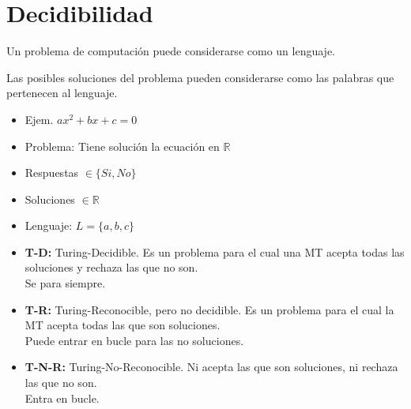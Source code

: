 \section{Decidibilidad}
Un problema de computación puede considerarse como un lenguaje.

Las posibles soluciones del problema pueden considerarse como las palabras que pertenecen al lenguaje.
\begin{itemize}
    \item Ejem. $ax^2+bx+c=0$
    \item Problema: Tiene solución la ecuación en $\mathbb{R}$
    \item Respuestas $\in \{Si, No\}$
    \item Soluciones $\in \mathbb{R}$
    \item Lenguaje: $L= \{a,b,c\}$
\end{itemize}

\begin{figure}[H]
    {
    }
\end{figure}
\begin{itemize}
    \item \textbf{T-D:} Turing-Decidible. Es un problema para el cual una MT acepta todas las soluciones y rechaza las que no son. \\ Se para siempre.
    \item \textbf{T-R:} Turing-Reconocible, pero no decidible. Es un problema para el cual la MT acepta todas las que son soluciones. \\ Puede entrar en bucle para las no soluciones.
    \item \textbf{T-N-R:} Turing-No-Reconocible. Ni acepta las que son soluciones, ni rechaza las que no son. \\ Entra en bucle.
\end{itemize}

